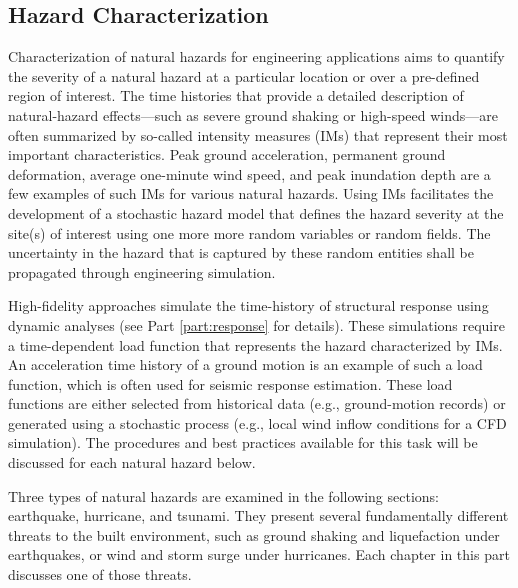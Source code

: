 
\begin{partbacktext}
\part{Hazard Characterization}
\label{part:hazard}

Characterization of natural hazards for engineering applications aims to quantify the severity of a natural hazard at a particular location or over a pre-defined region of interest. The time histories that provide a detailed description of natural-hazard effects---such as severe ground shaking or high-speed winds---are often summarized by so-called intensity measures (IMs) that represent their most important characteristics. Peak ground acceleration, permanent ground deformation, average one-minute wind speed, and peak inundation depth are a few examples of such IMs for various natural hazards. Using IMs facilitates the development of a stochastic hazard model that defines the hazard severity at the site(s) of interest using one more more random variables or random fields. The uncertainty in the hazard that is captured by these random entities shall be propagated through engineering simulation. 

High-fidelity approaches simulate the time-history of structural response using dynamic analyses (see Part \ref{part:response} for details). These simulations require a time-dependent load function that represents the hazard characterized by IMs. An acceleration time history of a ground motion is an example of such a load function, which is often used for seismic response estimation. These load functions are either selected from historical data (e.g., ground-motion records) or generated using a stochastic process (e.g., local wind inflow conditions for a CFD simulation). The procedures and best practices available for this task will be discussed for each natural hazard below.

Three types of natural hazards are examined in the following sections: earthquake, hurricane, and tsunami. They present several fundamentally different threats to the built environment, such as ground shaking and liquefaction under earthquakes, or wind and storm surge under hurricanes. Each chapter in this part discusses one of those threats.

\end{partbacktext}